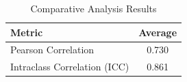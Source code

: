 \begin{table}[hbt]
\centering
\caption{Comparative Analysis Results}
\label{tab:comparative_analysis_results}
\begin{tabular}{lc}
\hline
\textbf{Metric} & \textbf{Average} \\
\hline
Pearson Correlation        & 0.730 \\
Intraclass Correlation (ICC) & 0.861 \\
\hline
\end{tabular}
\end{table}